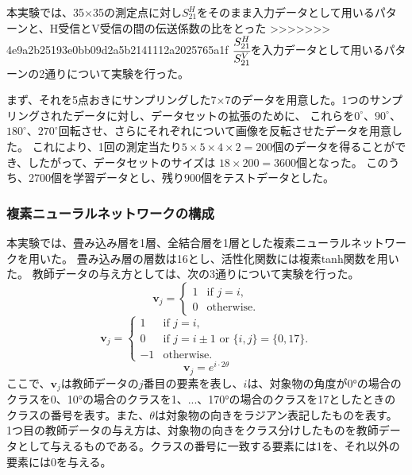 \documentclass[11pt,a4paper,uplatex]{ujarticle}
\begin{document}
  本実験では、35×35の測定点に対し$S_{21}^{H}$をそのまま入力データとして用いるパターンと、H受信とV受信の間の伝送係数の比をとった
>>>>>>> 4e9a2b25193e0bb09d2a5b2141112a2025765a1f
  $\cfrac{S_{21}^{H}}{S_{21}^{V}}$を入力データとして用いるパターンの2通りについて実験を行った。

  まず、それを5点おきにサンプリングした7×7のデータを用意した。1つのサンプリングされたデータに対し、データセットの拡張のために、
  これらを$0^\circ$、$90^\circ$、$180^\circ$、$270^\circ$回転させ、さらにそれぞれについて画像を反転させたデータを用意した。
  これにより、1回の測定当たり$5\times 5 \times 4 \times 2 = 200$個のデータを得ることができ、したがって、データセットのサイズは
  $18\times 200 = 3600$個となった。
  このうち、2700個を学習データとし、残り900個をテストデータとした。
  
  \subsubsection{複素ニューラルネットワークの構成}
  本実験では、畳み込み層を1層、全結合層を1層とした複素ニューラルネットワークを用いた。
  畳み込み層の層数は16とし、活性化関数には複素tanh関数を用いた。
  教師データの与え方としては、次の3通りについて実験を行った。
  \begin{equation}\label{eq:onehot}
    \mathbf{v}_j =
    \begin{cases}
        1 & \text{if } j = i, \\
        0 & \text{otherwise}.
    \end{cases}
  \end{equation}
  \begin{equation}\label{eq:soft}
    \mathbf{v}_j =
    \begin{cases}
        1 & \text{if } j = i, \\
        0 & \text{if } j = i \pm 1 \text{ or } \{i, j\} = \{0, 17\}.\\
        -1 & \text{otherwise}.
    \end{cases}
  \end{equation}
  \begin{equation}\label{eq:circular}
    \mathbf{v}_j = e^{i\cdot2\theta}
  \end{equation}
  ここで、$\mathbf{v}_j$は教師データの$j$番目の要素を表し、$i$は、対象物の角度が0°の場合のクラスを0、10°の場合のクラスを1、...、170°の場合のクラスを17としたときの
  クラスの番号を表す。また、$\theta$は対象物の向きをラジアン表記したものを表す。
  1つ目の教師データの与え方は、対象物の向きをクラス分けしたものを教師データとして与えるものである。クラスの番号に一致する要素には1を、それ以外の要素には0を与える。
\end{document}
